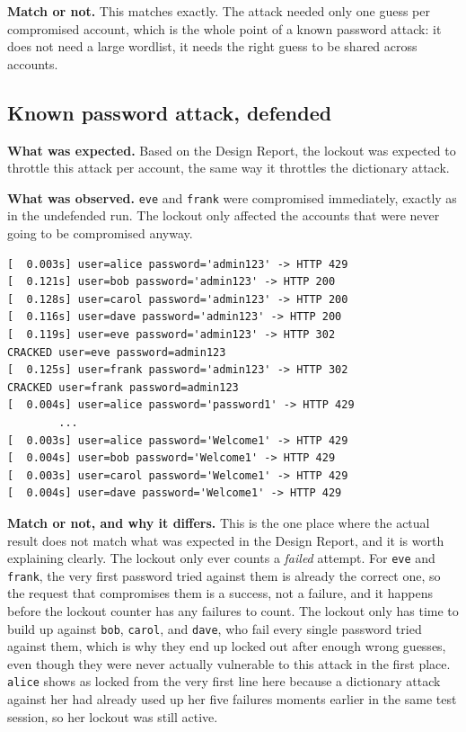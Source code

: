 \documentclass[11pt]{article}
\begin{document}
\textbf{Match or not.} This matches exactly. The attack needed only one
guess per compromised account, which is the whole point of a known
password attack: it does not need a large wordlist, it needs the right
guess to be shared across accounts.

\subsection{Known password attack, defended}

\textbf{What was expected.} Based on the Design Report, the lockout was
expected to throttle this attack per account, the same way it throttles the
dictionary attack.

\textbf{What was observed.} \texttt{eve} and \texttt{frank} were compromised
immediately, exactly as in the undefended run. The lockout only affected
the accounts that were never going to be compromised anyway.

\begin{lstlisting}
[  0.003s] user=alice password='admin123' -> HTTP 429
[  0.121s] user=bob password='admin123' -> HTTP 200
[  0.128s] user=carol password='admin123' -> HTTP 200
[  0.116s] user=dave password='admin123' -> HTTP 200
[  0.119s] user=eve password='admin123' -> HTTP 302
CRACKED user=eve password=admin123
[  0.125s] user=frank password='admin123' -> HTTP 302
CRACKED user=frank password=admin123
[  0.004s] user=alice password='password1' -> HTTP 429
        ...
[  0.003s] user=alice password='Welcome1' -> HTTP 429
[  0.004s] user=bob password='Welcome1' -> HTTP 429
[  0.003s] user=carol password='Welcome1' -> HTTP 429
[  0.004s] user=dave password='Welcome1' -> HTTP 429
\end{lstlisting}

\textbf{Match or not, and why it differs.} This is the one place where the
actual result does not match what was expected in the Design Report, and it
is worth explaining clearly. The lockout only ever counts a \emph{failed}
attempt. For \texttt{eve} and \texttt{frank}, the very first password tried
against them is already the correct one, so the request that
compromises them is a success, not a failure, and it happens before the
lockout counter has any failures to count. The lockout only has time to
build up against \texttt{bob}, \texttt{carol}, and \texttt{dave}, who fail
every single password tried against them, which is why they end up locked
out after enough wrong guesses, even though they were never actually
vulnerable to this attack in the first place. \texttt{alice} shows as
locked from the very first line here because a dictionary attack against
her had already used up her five failures moments earlier in the same test
session, so her lockout was still active.
\end{document}
